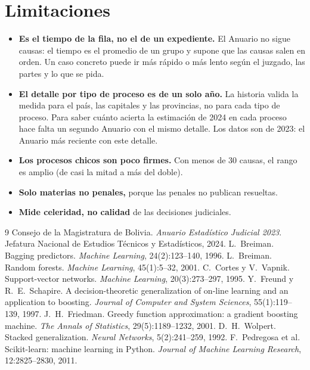 \documentclass[11pt,a4paper]{article}
\begin{document}
\section*{Limitaciones}
\begin{itemize}
  \item \textbf{Es el tiempo de la fila, no el de un expediente.} El Anuario no sigue causas: el tiempo es el promedio de
  un grupo y supone que las causas salen en orden. Un caso concreto puede ir más rápido o más lento según el juzgado, las
  partes y lo que se pida.
  \item \textbf{El detalle por tipo de proceso es de un solo año.} La historia valida la medida para el país, las capitales
  y las provincias, no para cada tipo de proceso. Para saber cuánto acierta la estimación de 2024 en cada proceso hace
  falta un segundo Anuario con el mismo detalle. Los datos son de 2023: el Anuario más reciente con este detalle.
  \item \textbf{Los procesos chicos son poco firmes.} Con menos de 30 causas, el rango es amplio (de casi la mitad a más del
  doble).
  \item \textbf{Solo materias no penales,} porque las penales no publican resueltas.
  \item \textbf{Mide celeridad, no calidad} de las decisiones judiciales.
\end{itemize}

\begin{thebibliography}{9}
 Consejo de la Magistratura de Bolivia. \emph{Anuario Estadístico Judicial 2023}. Jefatura Nacional de
  Estudios Técnicos y Estadísticos, 2024.
 L.~Breiman. Bagging predictors. \emph{Machine Learning}, 24(2):123--140, 1996.
 L.~Breiman. Random forests. \emph{Machine Learning}, 45(1):5--32, 2001.
 C.~Cortes y V.~Vapnik. Support-vector networks. \emph{Machine Learning}, 20(3):273--297, 1995.
 Y.~Freund y R.~E.~Schapire. A decision-theoretic generalization of on-line learning and an
  application to boosting. \emph{Journal of Computer and System Sciences}, 55(1):119--139, 1997.
 J.~H.~Friedman. Greedy function approximation: a gradient boosting machine. \emph{The Annals of
  Statistics}, 29(5):1189--1232, 2001.
 D.~H.~Wolpert. Stacked generalization. \emph{Neural Networks}, 5(2):241--259, 1992.
 F.~Pedregosa et al. Scikit-learn: machine learning in Python. \emph{Journal of Machine Learning
  Research}, 12:2825--2830, 2011.
\end{thebibliography}
\end{document}
